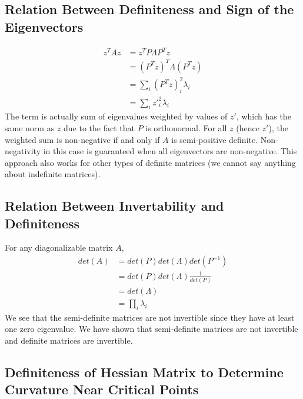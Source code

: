 \documentclass{article}
\numberwithin{equation}{subsection}
\begin{document}
\subsection{Relation Between Definiteness and Sign of the Eigenvectors}
\begin{align}
    z^TAz &= z^TP\Lambda P^Tz\\
    &= (P^Tz)^T\Lambda (P^Tz)\\
    &= \sum_i (P^Tz)_i^2 \lambda_i\\
    &= \sum_i z'_i^2 \lambda_i
\end{align}
The term is actually sum of eigenvalues weighted by values of $z'$, which has the same norm as $z$ due to the fact that $P$ is orthonormal. For all $z$ (hence $z'$), the weighted sum is non-negative if and only if $A$ is semi-positive definite. Non-negativity in this case is guaranteed when all eigenvectors are non-negative. This approach also works for other types of definite matrices (we cannot say anything about indefinite matrices). 
\subsection{Relation Between Invertability and Definiteness}
For any diagonalizable matrix $A$, 
\begin{align}
    det(A) &= det(P) det(\Lambda) det(P^{-1})\\
    &= det(P) det(\Lambda) \frac{1}{det(P)}\\
    &= det(\Lambda)\\
    &= \prod_i \lambda_i
\end{align}
We see that the semi-definite matrices are not invertible since they have at least one zero eigenvalue. We have shown that semi-definite matrices are not invertible and definite matrices are invertible.
\subsection{Definiteness of Hessian Matrix to Determine Curvature Near Critical Points}
\end{document}
